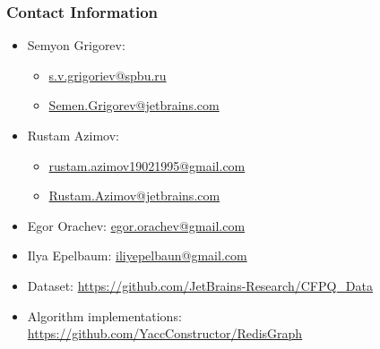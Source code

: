\documentclass[xcolor=table]{beamer}
\begin{document}
\begin{frame}
\frametitle{Contact Information}
\begin{itemize}
  \item Semyon Grigorev:
    \begin{itemize}
      \item \href{mailto:s.v.grigoriev@spbu.ru}{s.v.grigoriev@spbu.ru}
      \item \href{mailto:Semen.Grigorev@jetbrains.com}{Semen.Grigorev@jetbrains.com}
    \end{itemize}
  \item Rustam Azimov:
  \begin{itemize}
  	\item \href{mailto:rustam.azimov19021995@gmail.com}{rustam.azimov19021995@gmail.com}
  	\item \href{mailto:Rustam.Azimov@jetbrains.com}{Rustam.Azimov@jetbrains.com}
  \end{itemize}
  \item Egor Orachev: \href{mailto:egor.orachev@gmail.com}{egor.orachev@gmail.com}
  \item Ilya Epelbaum: \href{mailto:iliyepelbaun@gmail.com}{iliyepelbaun@gmail.com}
\vspace{0.5cm}
  \item Dataset: \href{https://github.com/JetBrains-Research/CFPQ_Data}{https://github.com/JetBrains-Research/CFPQ\_Data}
   \item Algorithm implementations: \href{https://github.com/YaccConstructor/RedisGraph}{https://github.com/YaccConstructor/RedisGraph}
\end{itemize}
\vspace{0.1cm}
\end{frame}
\end{document}

